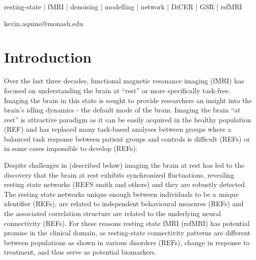 \documentclass[oneside]{zHenriquesLab-StyleBioRxiv}
\begin{document}
\begin{keywords}
resting-state | fMRI | denoising | modelling | network | DiCER | GSR | rsfMRI
\end{keywords}

\begin{corrauthor}
kevin.aquino@monash.edu
\end{corrauthor}


\section*{Introduction}






Over the last three decades, functional magnetic resonance imaging (fMRI) has  focused on understanding the brain at ``rest'' or more specifically task-free. Imaging the brain in this state is sought to provide researchers an insight into the brain's idling dynamics - the default mode of the brain. Imaging the brain ``at rest'' is attractive paradigm as it can be easily acquired in the healthy population (REF) and has replaced many task-based analyses between groups where a balanced task response between patient groups and controls is difficult (REFs) or in some cases impossible to develop (REFs).


Despite challenges in (described below) imaging the brain at rest has led to the discovery that the brain at rest exhibits synchronized fluctuations, revealing resting state networks (REFS smith and others) and they are robustly detected. The resting state networks unique enough between individuals to be a unique identifier (REFs), are related to independent behavioural measures (REFs) and the associated correlation structure are related to the underlying neural connectivity (REFs). For these reasons resting state fMRI (rsfMRI) has potential promise in the clinical domain, as resting-state connectivity patterns are different between populations as shown in various disorders (REFs), change in response to treatment, and thus serve as potential biomarkers. 
\end{document}
